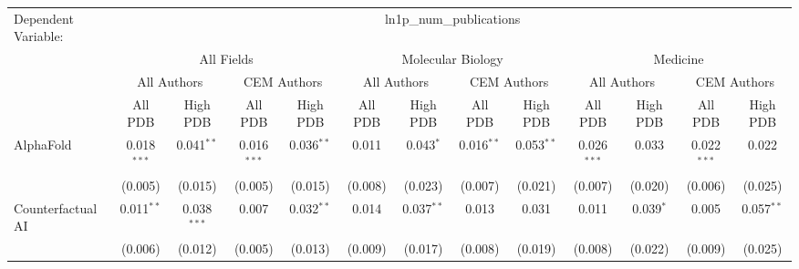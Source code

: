 \begingroup
\centering
\begin{tabular}{lcccccccccccc}
   \tabularnewline \midrule \midrule
   Dependent Variable: & \multicolumn{12}{c}{ln1p\_num\_publications}\\
 & \multicolumn{4}{c}{All Fields} & \multicolumn{4}{c}{Molecular Biology} & \multicolumn{4}{c}{Medicine} \\
\cmidrule(lr){2-5} \cmidrule(lr){6-9} \cmidrule(lr){10-13}
 & \multicolumn{2}{c}{All Authors} & \multicolumn{2}{c}{CEM Authors} & \multicolumn{2}{c}{All Authors} & \multicolumn{2}{c}{CEM Authors} & \multicolumn{2}{c}{All Authors} & \multicolumn{2}{c}{CEM Authors} \\
\cmidrule(lr){2-3} \cmidrule(lr){4-5} \cmidrule(lr){6-7} \cmidrule(lr){8-9} \cmidrule(lr){10-11} \cmidrule(lr){12-13}
 & \multicolumn{1}{c}{All PDB} & \multicolumn{1}{c}{High PDB} & \multicolumn{1}{c}{All PDB} & \multicolumn{1}{c}{High PDB} & \multicolumn{1}{c}{All PDB} & \multicolumn{1}{c}{High PDB} & \multicolumn{1}{c}{All PDB} & \multicolumn{1}{c}{High PDB} & \multicolumn{1}{c}{All PDB} & \multicolumn{1}{c}{High PDB} & \multicolumn{1}{c}{All PDB} & \multicolumn{1}{c}{High PDB} \\
\cmidrule(lr){2-2} \cmidrule(lr){3-3} \cmidrule(lr){4-4} \cmidrule(lr){5-5} \cmidrule(lr){6-6} \cmidrule(lr){7-7} \cmidrule(lr){8-8} \cmidrule(lr){9-9} \cmidrule(lr){10-10} \cmidrule(lr){11-11} \cmidrule(lr){12-12} \cmidrule(lr){13-13}
   AlphaFold                                                  & 0.018$^{***}$ & 0.041$^{**}$  & 0.016$^{***}$  & 0.036$^{**}$   & 0.011         & 0.043$^{*}$    & 0.016$^{**}$  & 0.053$^{**}$   & 0.026$^{***}$ & 0.033        & 0.022$^{***}$ & 0.022\\   
                                                              & (0.005)       & (0.015)       & (0.005)        & (0.015)        & (0.008)       & (0.023)        & (0.007)       & (0.021)        & (0.007)       & (0.020)      & (0.006)       & (0.025)\\   
   Counterfactual AI                                          & 0.011$^{**}$  & 0.038$^{***}$ & 0.007          & 0.032$^{**}$   & 0.014         & 0.037$^{**}$   & 0.013         & 0.031          & 0.011         & 0.039$^{*}$  & 0.005         & 0.057$^{**}$\\   
                                                              & (0.006)       & (0.012)       & (0.005)        & (0.013)        & (0.009)       & (0.017)        & (0.008)       & (0.019)        & (0.008)       & (0.022)      & (0.009)       & (0.025)\\   

\end{tabular}
